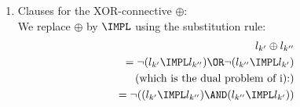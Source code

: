 {\begin{enumerate}
\bigskip
\item
Clauses for the XOR-connective $\oplus$: \\
We replace $\oplus$ by $\IMPL$ using the substitution rule:
\begin{eqnarray*}
l_{k'} \oplus l_{k''}\\
= \neg(l_{k'} \IMPL l_{k''}) \OR \neg (l_{k''} \IMPL l_{k'})\\
\text{(which is the dual problem of i):)}\\
= \neg((l_{k'} \IMPL l_{k''}) \AND (l_{k''} \IMPL l_{k'}))\\ 
\end{eqnarray*}

\end{enumerate}

}